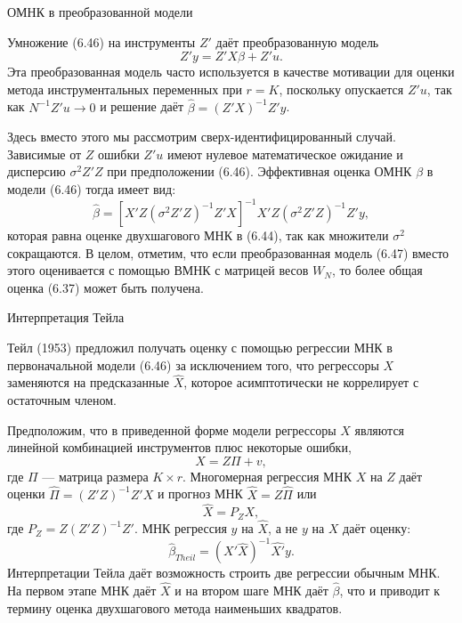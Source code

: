 \begin{center}
ОМНК в преобразованной модели
\end{center}

Умножение (6.46) на инструменты $Z'$ даёт преобразованную модель
\begin{equation}
Z'y=Z'X \beta+Z'u.
\end{equation}
Эта преобразованная модель часто используется в качестве мотивации для оценки метода инструментальных переменных при $r=K$, поскольку опускается $Z'u$, так как $N^{-1} Z'u \rightarrow 0$ и решение даёт $\hat{\beta}=(Z'X)^{-1}Z'y$.

Здесь вместо этого мы рассмотрим сверх-идентифицированный случай. Зависимые от $Z$ ошибки $Z'u$ имеют нулевое математическое ожидание и дисперсию $\sigma^2 Z'Z$ при предположении (6.46). Эффективная оценка ОМНК $\beta$ в модели (6.46) тогда имеет вид:
\begin{equation}
\hat{\beta}=[X' Z (\sigma^2 Z'Z)^{-1} Z' X]^{-1} X' Z (\sigma^2 Z'Z)^{-1} Z' y,
\end{equation}
которая равна оценке двухшагового МНК в (6.44), так как множители $\sigma^2$ сокращаются. В целом, отметим, что если преобразованная модель (6.47) вместо этого оценивается с помощью ВМНК с матрицей весов $W_N$, то более общая оценка (6.37) может быть получена.

\begin{center}
Интерпретация Тейла 
\end{center}

Тейл (1953) предложил получать оценку с помощью регрессии МНК в первоначальной модели (6.46) за исключением того, что регрессоры $X$ заменяются на предсказанные $\hat{X}$, которое асимптотически не коррелирует с остаточным членом.

Предположим, что в приведенной форме модели регрессоры $X$ являются линейной комбинацией инструментов плюс некоторые ошибки, 
\begin{equation}
X = Z \Pi + v,
\end{equation}
где $\Pi$  --- матрица размера $K \times r$. Многомерная регрессия МНК $X$ на $Z$ даёт оценки  $\hat{\Pi}=(Z' Z)^{-1} Z' X$ и прогноз МНК $\hat{X}=Z\hat{\Pi}$ или
\[
\hat{X}= P_{Z} X,
\]
где $P_{Z}=Z(Z' Z)^{-1} Z'$. МНК регрессия $y$ на $\hat{X}$, а не $y$ на $X$ даёт оценку:
\begin{equation}
\hat{\beta}_{Theil}=(\hat{X'}\hat{X})^{-1} \hat{X'}y.
\end{equation}
Интерпретации Тейла даёт возможность строить две регрессии обычным МНК. На первом этапе МНК даёт $\hat{X}$ и на втором шаге МНК даёт $\hat{\beta}$, что и приводит к термину оценка двухшагового метода наименьших квадратов.

